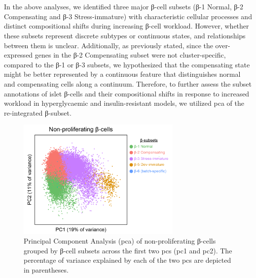 \clearpage

\section{}
\label{sec:chp3_betaPCA}
In the above analyses, we identified three major β-cell subsets (β-1 Normal, β-2 Compensating and β-3 Stress-immature) with characteristic cellular processes and distinct compositional shifts during increasing β-cell workload. However, whether these subsets represent discrete subtypes or continuous states, and relationships between them is unclear. Additionally, as previously stated, since the over-expressed genes in the β-2 Compensating subset were not cluster-specific, compared to the β-1 or β-3 subsets, we hypothesized that the compensating state might be better represented by a continuous feature that distinguishes normal and compensating cells along a continuum. Therefore, to further assess the subset annotations of islet β-cells and their compositional shifts in response to increased workload in hyperglycaemic and insulin-resistant models, we utilized \gls{pca} of the re-integrated β-subset.\\


\begin{figure}
\includegraphics[width=8cm]{Chapter5/Fig/F3-6-01.png}
\caption[PCA of Non-proliferating β-cell subsets]{Principal Component Analysis (\gls{pca}) of non-proliferating β-cells grouped by β-cell subsets across the first two \glspl{pc} (\gls{pc}1 and \gls{pc}2). The percentage of variance explained by each of the two \glspl{pc} are depicted in parentheses.}
\label{fig:3-5}
\end{figure}


